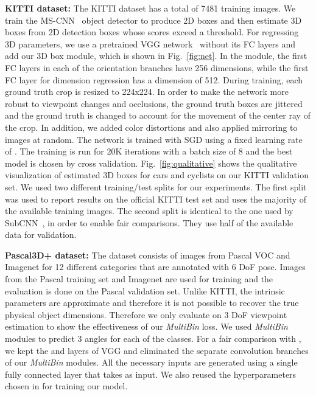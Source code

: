 \documentclass[10pt,twocolumn,letterpaper]{article}
\begin{document}
 \noindent\textbf{KITTI dataset:} The KITTI dataset has a total of 7481 training images. We train the MS-CNN~\cite{MSCNN2016} object detector to produce 2D boxes and then estimate 3D boxes from 2D detection boxes whose scores exceed a threshold. 
For regressing 3D parameters, we use a pretrained VGG network~\cite{Simonyan14c} without its FC layers and add our 3D box module, which is shown in Fig.~\ref{fig:net}. In the module, the first FC layers in each of the orientation branches have 256 dimensions, while the first FC layer for dimension regression has a dimension of 512. During training, each ground truth crop is resized to 224x224. In order to make the network more robust to viewpoint changes and occlusions, the ground truth boxes are jittered and the ground truth  is changed to account for the movement of the center ray of the crop. In addition, we added color distortions and also applied mirroring to images at random. The network is trained with SGD using a fixed learning rate of . The training is run for 20K iterations with a batch size of 8 and the best model is chosen by cross validation. Fig.~\ref{fig:qualitative} shows the qualitative visualization of estimated 3D boxes for cars and cyclists on our KITTI validation set. We used two different training/test splits for our experiments. The first split was used to report results on the official KITTI test set and uses the majority of the available training images. The second split is identical to the one used by  SubCNN~\cite{xiang2016subcategory}, in order to enable fair comparisons. They use half of the available data for validation. 

\noindent\textbf{Pascal3D+ dataset:} The dataset consists of images from Pascal VOC and Imagenet for 12 different categories that are annotated with 6 DoF pose. Images from the Pascal training set and Imagenet are used for training and the evaluation is done on the Pascal validation set. Unlike KITTI, the intrinsic parameters are approximate and therefore it is not possible to recover the true physical object dimensions. Therefore we only evaluate on 3 DoF viewpoint estimation to show the effectiveness of our \emph{MultiBin} loss.
We used  \emph{MultiBin} modules to predict 3 angles for each of the  classes. 
For a fair comparison with \cite{TulsianiCVPR15}, we kept the  and  layers of VGG and eliminated the separate convolution branches of our \emph{MultiBin} modules. All the necessary inputs are generated using a single fully connected layer that takes  as input. We also reused the hyperparameters chosen in \cite{TulsianiCVPR15} for training our model.  
\end{document}
